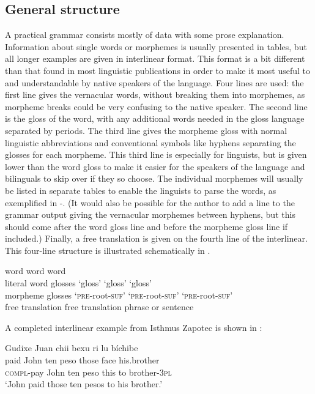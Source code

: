 \subsection{General structure}\label{sPracticalStructure}
A practical grammar consists mostly of data with some prose explanation. Information about single words or morphemes is usually presented in tables, but all longer examples are given in interlinear format. This format is a bit different than that found in most linguistic publications in order to make it most useful to and understandable by native speakers of the language. Four lines are used: the first line gives the vernacular words, without breaking them into morphemes, as morpheme breaks could be very confusing to the native speaker. The second line is the gloss of the word, with any additional words needed in the gloss language separated by periods. The third line gives the morpheme gloss with normal linguistic abbreviations and conventional symbols like hyphens separating the glosses for each morpheme. This third line is especially for linguists, but is given lower than the word gloss to make it easier for the speakers of the language and bilinguals to skip over if they so choose. The individual morphemes will usually be listed in separate tables to enable the linguists to parse the words, as exemplified in -. (It would also be possible for the author to add a line to the grammar output giving the vernacular morphemes between hyphens, but this should come after the word gloss line and before the morpheme gloss line if included.) Finally, a free translation is given on the fourth line of the interlinear. This four-line structure is illustrated schematically in .


\let\eachwordtwo=\it
\let\eachwordthree=\rm

\ea  \label{xInterlinearEx}%
 word word word\\
      {\sc literal word glosses} `gloss' `gloss' `gloss'\\
 {\sc morpheme glosses} `\textsc{pre}-root-\textsc{suf}' `\textsc{pre}-root-\textsc{suf}' `\textsc{pre}-root-\textsc{suf}'\\
 {\sc free translation}  free translation phrase or sentence\\
\z


A completed interlinear example from Isthmus Zapotec is shown in :

\ea  \label{xInterlinearIZ}%
\glll Gudixe Juan chii bexu ri{\saltillo}   lu   bí{\saltillo}chibe\\
paid   John ten  peso those face his.brother\\
\textsc{compl}-pay John ten peso this to brother-\textsc{3pl}\\
 `John paid those ten pesos to his brother.'
\z

